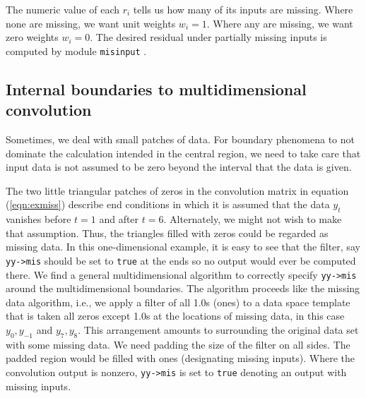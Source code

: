 \par
The numeric value of each $r_i$ tells us how many of its inputs are missing.
Where none are missing, we want unit weights $w_i=1$.
Where any are missing, we want zero weights $w_i=0$.
The desired residual under partially missing inputs is computed
by module \texttt{misinput}
.




\subsection{Internal boundaries to multidimensional convolution }

\par
Sometimes,
we deal with small patches of data.
For boundary phenomena to not dominate
the calculation intended in the central region,
we need to take care that
input data is not assumed to be zero
beyond the interval that the data is given.

\par
The two little triangular patches of zeros in
the convolution matrix in equation (\ref{eqn:exmiss})
describe end conditions in which it is assumed that the data $y_t$
vanishes before $t=1$ and after $t=6$.
Alternately, we might not wish to make that assumption.
Thus, the triangles filled with zeros could be regarded as missing data.
In this one-dimensional example,
it is easy to see that the filter, say
\verb#yy->mis#
should be set to \texttt{true} at the ends so no output
would ever be computed there.
We find a general multidimensional algorithm
to correctly specify
\verb#yy->mis#
around the multidimensional boundaries.
The algorithm proceeds like the missing data algorithm,
i.e., we apply a filter of all 1.0s (ones) to a data space template that is taken
all zeros except 1.0s at the locations of missing data,
in this case $y_0,y_{-1}$ and $y_7,y_8$.
This arrangement amounts to surrounding the original data set with some missing data.
We need padding the size of the filter on all sides.
The padded region would be filled
with ones (designating missing inputs).
Where the convolution output is nonzero, 
\verb#yy->mis# is set to \texttt{true}
denoting an output with missing inputs.

